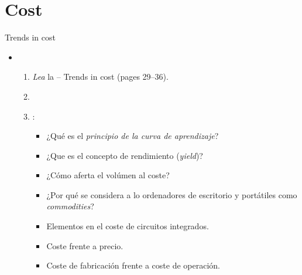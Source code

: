 \section{Cost}

\begin{frame}[t]{Trends in cost}
\begin{itemize}
  \item {}
    \begin{enumerate}
      \item \emph{Lea} la  -- Trends in cost (pages 29--36).
        \item \bibhennessy

      \item {}:
        \begin{itemize}
          \item ¿Qué es el \emph{principio de la curva de aprendizaje}?
          \item ¿Que es el concepto de rendimiento (\emph{yield})?
          \item ¿Cómo aferta el volúmen al coste?
          \item ¿Por qué se considera a lo ordenadores de escritorio y portátiles como
                \emph{commodities}?
          \item Elementos en el coste de circuitos integrados.
          \item Coste frente a precio.
          \item Coste de fabricación frente a coste de operación.
        \end{itemize}
    \end{enumerate}
\end{itemize}
\end{frame}

